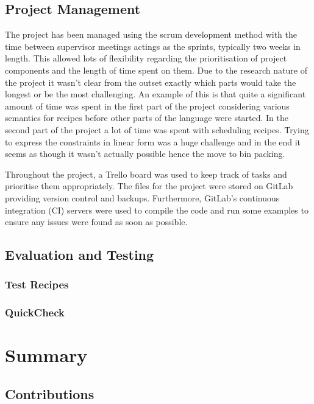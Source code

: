 \documentclass[11pt]{article}
\begin{document}
\subsection{Project Management}

The project has been managed using the scrum development method with the time
between supervisor meetings actings as the sprints, typically two weeks in length.
This allowed lots of flexibility regarding the prioritisation of project
components and the length of time spent on them. Due to the research nature
of the project it wasn't clear from the outset exactly which parts would take the
longest or be the most challenging. An example of this is that
quite a significant amount of time was spent in the first part of the project
considering various semantics for recipes before other parts of the language
were started. In the second part of the project a lot of time was spent
with scheduling recipes. Trying to express the constraints in linear form
was a huge challenge and in the end it seems as though it wasn't actually possible
hence the move to bin packing.

\medbreak

Throughout the project, a Trello board was used to keep track of tasks
and prioritise them appropriately. The files for the project were stored
on GitLab providing version control and backups. Furthermore, GitLab's
continuous integration (CI) servers were used to compile the code and run
some examples to ensure any issues were found as soon as possible.

\subsection{Evaluation and Testing}

\subsubsection{Test Recipes}

\subsubsection{QuickCheck}

\section{Summary}

\subsection{Contributions}
\end{document}
